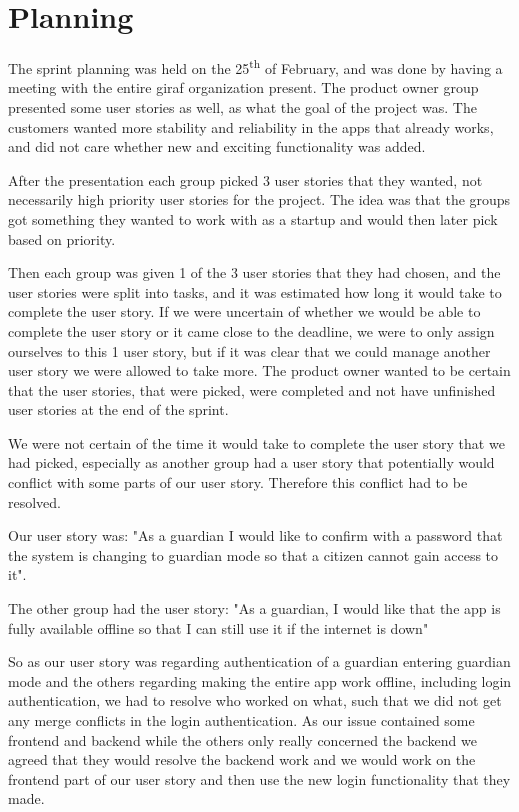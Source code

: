 \section{Planning}
The sprint planning was held on the 25\textsuperscript{th} of February, and was done by having a meeting with the entire giraf organization present. The product owner group presented some user stories as well, as what the goal of the project was. The customers wanted more stability and reliability in the apps that already works, and did not care whether new and exciting functionality was added. 

After the presentation each group picked 3 user stories that they wanted, not necessarily high priority user stories for the project. The idea was that the groups got something they wanted to work with as a startup and would then later pick based on priority.

Then each group was given 1 of the 3 user stories that they had chosen, and the user stories were split into tasks, and it was estimated how long it would take to complete the user story. If we were uncertain of whether we would be able to complete the user story or it came close to the deadline, we were to only assign ourselves to this 1 user story, but if it was clear that we could manage another user story we were allowed to take more. The product owner wanted to be certain that the user stories, that were picked, were completed and not have unfinished user stories at the end of the sprint.

We were not certain of the time it would take to complete the user story that we had picked, especially as another group had a user story that potentially would conflict with some parts of our user story. Therefore this conflict had to be resolved.

Our user story was: "As a guardian I would like to confirm with a password that the system is changing to guardian mode so that a citizen cannot gain access to it".

The other group had the user story: "As a guardian, I would like that the app is fully available offline so that I can still use it if the internet is down"

So as our user story was regarding authentication of a guardian entering guardian mode and the others regarding making the entire app work offline, including login authentication, we had to resolve who worked on what, such that we did not get any merge conflicts in the login authentication. As our issue contained some frontend and backend while the others only really concerned the backend we agreed that they would resolve the backend work and we would work on the frontend part of our user story and then use the new login functionality that they made.
